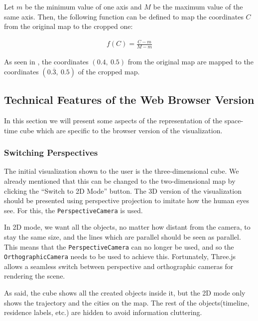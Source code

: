 Let $m$ be the minimum value of one axis and $M$ be the maximum value of the same axis. Then, the following function can be defined to map the
coordinates $C$ from the original map to the cropped one:

\begin{align*}
    f(C) = \frac{C - m}{M - m}
\end{align*}

As seen in , the coordinates $(0.4,\ 0.5)$ from the original map are mapped to the coordinates $(0.\overline 3,\ 0.5)$ of the
cropped map.

\subsection{Technical Features of the Web Browser Version}\label{subsec:technical-specifics-browser-version}

In this section we will present some aspects of the representation of the space-time cube which are specific to the browser version of the
visualization.

\subsubsection{Switching Perspectives}

The initial visualization shown to the user is the three-dimensional cube. We already mentioned that this can be changed to the two-dimensional map
by clicking the ``Switch to 2D Mode'' button. The 3D version of the visualization should be presented using perspective projection to imitate how
the human eyes see. For this, the \texttt{PerspectiveCamera} is used.

In 2D mode, we want all the objects, no matter how distant from the camera, to stay the same size, and the lines which are parallel should be seen
as parallel. This means that the \texttt{PerspectiveCamera} can no longer be used, and so the \texttt{OrthographicCamera} needs to be used to
achieve this. Fortunately, Three.js allows a seamless switch between perspective and orthographic cameras for rendering the scene.

As said, the cube shows all the created objects inside it, but the 2D mode only shows the trajectory and the cities on the map. The rest of the
objects(timeline, residence labels, etc.) are hidden to avoid information cluttering.

